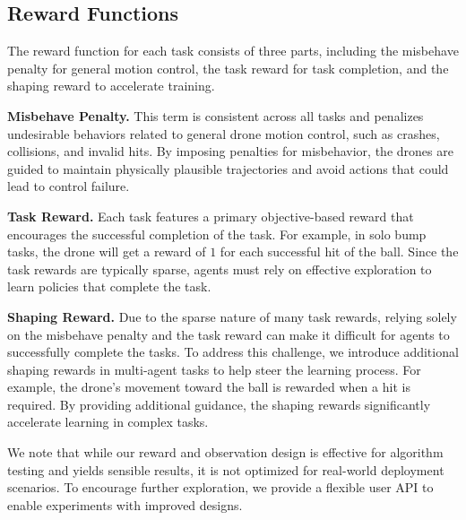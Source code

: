 \subsection{Reward Functions}

The reward function for each task consists of three parts, including the misbehave penalty for general motion control, the task reward for task completion, and the shaping reward to accelerate training.

\textbf{Misbehave Penalty.}
This term is consistent across all tasks and penalizes undesirable behaviors related to general drone motion control, such as crashes, collisions, and invalid hits. By imposing penalties for misbehavior, the drones are guided to maintain physically plausible trajectories and avoid actions that could lead to control failure.

\textbf{Task Reward.}
Each task features a primary objective-based reward that encourages the successful completion of the task. For example, in solo bump tasks, the drone will get a reward of $1$ for each successful hit of the ball. Since the task rewards are typically sparse, agents must rely on effective exploration to learn policies that complete the task.

\textbf{Shaping Reward.}
Due to the sparse nature of many task rewards, relying solely on the misbehave penalty and the task reward can make it difficult for agents to successfully complete the tasks. To address this challenge, we introduce additional shaping rewards in multi-agent tasks to help steer the learning process. For example, the drone's movement toward the ball is rewarded when a hit is required. By providing additional guidance, the shaping rewards significantly accelerate learning in complex tasks.

We note that while our reward and observation design is effective for algorithm testing and yields sensible results, it is not optimized for real-world deployment scenarios. To encourage further exploration, we provide a flexible user API to enable experiments with improved designs.


